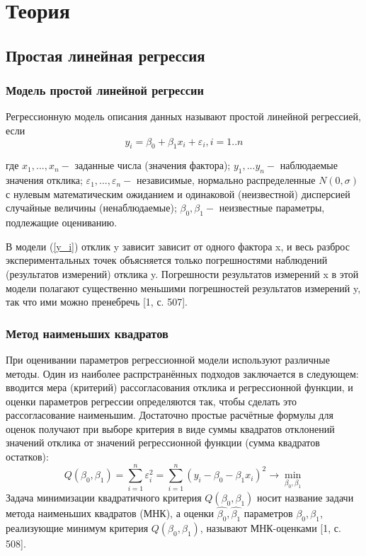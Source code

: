 \documentclass{article}
\begin{document}
\section{Теория}
\subsection{Простая линейная регрессия}
	\subsubsection{Модель простой линейной регрессии}
	\noindent Регрессионную модель описания данных называют простой линейной регрессией, если
	\begin{equation}
	    y_{i} = \beta_{0} + \beta_{1}x_{i} + \varepsilon_{i},  i = 1..n
	    \label{y_i}
	\end{equation}

	\noindent где $x_1,...,x_n - $ заданные числа (значения фактора);
	$y_1,...y_n - $ наблюдаемые значения отклика;
	$\varepsilon_1,...,\varepsilon_n - $ независимые, нормально распределенные $N(0, \sigma)$ с нулевым математическим ожиданием и одинаковой (неизвестной) дисперсией случайные величины (ненаблюдаемые);
	$\beta_0, \beta_1 - $ неизвестные параметры, подлежащие оцениванию.
	
    \noindent В модели (\ref{y_i}) отклик y зависит зависит от одного фактора x, и весь разброс экспериментальных точек объясняется только погрешностями наблюдений (результатов измерений) отклика y. Погрешности результатов измерений x в этой модели полагают существенно меньшими погрешностей результатов измерений y, так что ими можно пренебречь [1, с. 507].

	\subsubsection{Метод наименьших квадратов}
	\noindent При оценивании параметров регрессионной модели используют различные методы. Один из наиболее распрстранённых подходов заключается в следующем: вводится мера (критерий) рассогласования отклика и регрессионной функции, и оценки параметров регрессии определяются так, чтобы сделать это рассогласование наименьшим. Достаточно простые расчётные формулы для оценок получают при выборе критерия в виде суммы квадратов отклонений значений отклика от значений регрессионной функции (сумма квадратов остатков):
	\begin{equation}
	    Q(\beta_{0}, \beta_{1}) = \sum_{i=1}^{n}{\varepsilon_{i}^{2}} = 
	    \sum_{i=1}^{n}{(y_{i} - \beta_{0} - \beta_{1}x_{i})^{2}}\rightarrow \min_{\beta_{0}, \beta_{1}}
	    \label{Q_beta}
	\end{equation}
	Задача минимизации квадратичного критерия $Q(\beta_0, \beta_1)$ носит название задачи метода наименьших квадратов (МНК), а оценки $\hat{\beta_0}, \hat{\beta_1}$ параметров $\beta_0, \beta_1$, реализующие минимум критерия $Q(\beta_0, \beta_1)$, называют МНК-оценками [1, с. 508]. 
\end{document}
